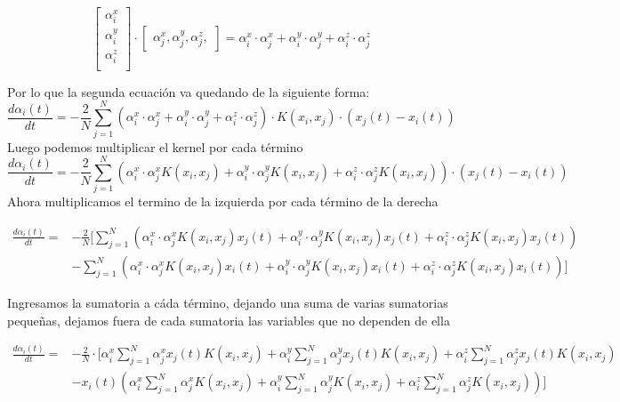 \documentclass[letter, 10pt]{article}
\begin{document}
\begin{equation}
\begin{bmatrix}
\alpha_i^x\\
\alpha_i^y\\
\alpha_i^z\\
\end{bmatrix} \cdot
\begin{bmatrix}
\alpha_j^x ,
\alpha_j^y ,
\alpha_j^z ,
\end{bmatrix} =
\alpha_i^x \cdot \alpha_j^x +
\alpha_i^y \cdot \alpha_j^y +
\alpha_i^z \cdot \alpha_j^z 
\end{equation}

Por lo que la segunda ecuación va quedando de la siguiente forma:
\begin{equation}
\frac{d\alpha_i(t)}{dt} = -\frac{2}{N} \sum_{j=1}^N \left( \alpha_i^x \cdot \alpha_j^x +
\alpha_i^y \cdot \alpha_j^y +
\alpha_i^z \cdot \alpha_j^z \right) \cdot K(x_i, x_j) \cdot (x_j(t) - x_i(t))
\end{equation}
Luego podemos multiplicar el kernel por cada término
\begin{equation}
\frac{d\alpha_i(t)}{dt} = -\frac{2}{N} \sum_{j=1}^N \left( \alpha_i^x \cdot \alpha_j^x K(x_i, x_j) +
\alpha_i^y \cdot \alpha_j^y K(x_i, x_j) +
\alpha_i^z \cdot \alpha_j^z K(x_i, x_j) \right) \cdot (x_j(t) - x_i(t))
\end{equation}
Ahora multiplicamos el termino de la izquierda por cada término de la derecha

\begin{align*}
    \frac{d\alpha_i(t)}{dt} =& -\frac{2}{N} [ \sum_{j=1}^N \left( \alpha_i^x \cdot \alpha_j^x K(x_i, x_j) x_j(t) +\alpha_i^y \cdot \alpha_j^y K(x_i, x_j) x_j(t) +\alpha_i^z \cdot \alpha_j^z K(x_i, x_j) x_j(t)  \right)
    \\ &-\sum_{j=1}^N \left( \alpha_i^x \cdot \alpha_j^x K(x_i, x_j) x_i(t) +\alpha_i^y \cdot \alpha_j^y K(x_i, x_j) x_i(t) +\alpha_i^z \cdot \alpha_j^z K(x_i, x_j) x_i(t)  \right) ]
\end{align*}

Ingresamos la sumatoria a cáda término, dejando una suma de varias sumatorias pequeñas, dejamos fuera de cada sumatoria las variables que no dependen de ella

\begin{align*}
    \frac{d\alpha_i(t)}{dt} =& -\frac{2}{N} \cdot [
    \alpha_i^x \sum_{j=1}^N  \alpha_j^x x_j(t) K(x_i, x_j) 
    +\alpha_i^y \sum_{j=1}^N \alpha_j^y x_j(t) K(x_i, x_j) 
    +\alpha_i^z \sum_{j=1}^N \alpha_j^z x_j(t) K(x_i, x_j)  \\ 
    &- x_i(t)  (\alpha_i^x \sum_{j=1}^N \alpha_j^x K(x_i, x_j)
    +\alpha_i^y \sum_{j=1}^N \alpha_j^y K(x_i, x_j) 
    +\alpha_i^z \sum_{j=1}^N \alpha_j^z K(x_i, x_j)  
   )
    ]
\end{align*}
\end{document}
